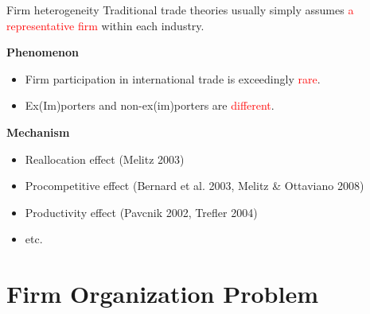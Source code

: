 \documentclass{beamer}
\begin{document}
\begin{frame}{Firm heterogeneity}
	Traditional trade theories usually simply assumes \textcolor{red}{a representative firm} within each industry.
	\medskip

	\textbf{Phenomenon}
	\begin{itemize}
		\item Firm participation in international trade is exceedingly \textcolor{red}{rare}.
		\item Ex(Im)porters and non-ex(im)porters are \textcolor{red}{different}.
	\end{itemize}
	\medskip

	\textbf{Mechanism}
	\begin{itemize}
		\item Reallocation effect (Melitz 2003)
		\item Procompetitive effect (Bernard et al. 2003, Melitz \& Ottaviano 2008)
		\item Productivity effect (Pavcnik 2002, Trefler 2004)
		\item etc.
	\end{itemize}
\end{frame}
\section{Firm Organization Problem}
\begin{frame}[shrink]
	\transfade %
	\tableofcontents[sectionstyle=show/shaded,subsectionstyle=show/shaded/hide]
	\addtocounter{framenumber}{-1}
\end{frame}
\end{document}
